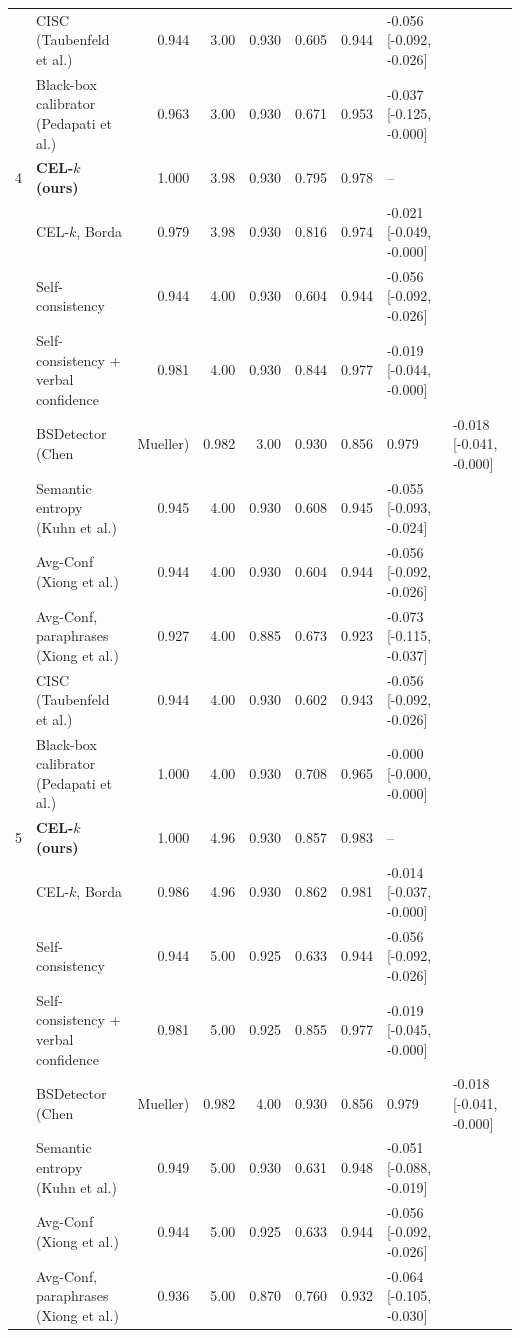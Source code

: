 \begin{table}[t]
\begin{tabular}{llrrrrrl}
 & CISC (Taubenfeld et al.) & 0.944 & 3.00 & 0.930 & 0.605 & 0.944 & -0.056 [-0.092, -0.026] \\
 & Black-box calibrator (Pedapati et al.) & 0.963 & 3.00 & 0.930 & 0.671 & 0.953 & -0.037 [-0.125, -0.000] \\
4 & \textbf{CEL-$k$ (ours)} & 1.000 & 3.98 & 0.930 & 0.795 & 0.978 & -- \\
 & \quad CEL-$k$, Borda & 0.979 & 3.98 & 0.930 & 0.816 & 0.974 & -0.021 [-0.049, -0.000] \\
 & Self-consistency & 0.944 & 4.00 & 0.930 & 0.604 & 0.944 & -0.056 [-0.092, -0.026] \\
 & Self-consistency + verbal confidence & 0.981 & 4.00 & 0.930 & 0.844 & 0.977 & -0.019 [-0.044, -0.000] \\
 & BSDetector (Chen & Mueller) & 0.982 & 3.00 & 0.930 & 0.856 & 0.979 & -0.018 [-0.041, -0.000] \\
 & Semantic entropy (Kuhn et al.) & 0.945 & 4.00 & 0.930 & 0.608 & 0.945 & -0.055 [-0.093, -0.024] \\
 & Avg-Conf (Xiong et al.) & 0.944 & 4.00 & 0.930 & 0.604 & 0.944 & -0.056 [-0.092, -0.026] \\
 & Avg-Conf, paraphrases (Xiong et al.) & 0.927 & 4.00 & 0.885 & 0.673 & 0.923 & -0.073 [-0.115, -0.037] \\
 & CISC (Taubenfeld et al.) & 0.944 & 4.00 & 0.930 & 0.602 & 0.943 & -0.056 [-0.092, -0.026] \\
 & Black-box calibrator (Pedapati et al.) & 1.000 & 4.00 & 0.930 & 0.708 & 0.965 & -0.000 [-0.000, -0.000] \\
5 & \textbf{CEL-$k$ (ours)} & 1.000 & 4.96 & 0.930 & 0.857 & 0.983 & -- \\
 & \quad CEL-$k$, Borda & 0.986 & 4.96 & 0.930 & 0.862 & 0.981 & -0.014 [-0.037, -0.000] \\
 & Self-consistency & 0.944 & 5.00 & 0.925 & 0.633 & 0.944 & -0.056 [-0.092, -0.026] \\
 & Self-consistency + verbal confidence & 0.981 & 5.00 & 0.925 & 0.855 & 0.977 & -0.019 [-0.045, -0.000] \\
 & BSDetector (Chen & Mueller) & 0.982 & 4.00 & 0.930 & 0.856 & 0.979 & -0.018 [-0.041, -0.000] \\
 & Semantic entropy (Kuhn et al.) & 0.949 & 5.00 & 0.930 & 0.631 & 0.948 & -0.051 [-0.088, -0.019] \\
 & Avg-Conf (Xiong et al.) & 0.944 & 5.00 & 0.925 & 0.633 & 0.944 & -0.056 [-0.092, -0.026] \\
 & Avg-Conf, paraphrases (Xiong et al.) & 0.936 & 5.00 & 0.870 & 0.760 & 0.932 & -0.064 [-0.105, -0.030] \\

\end{tabular}
\end{table}
